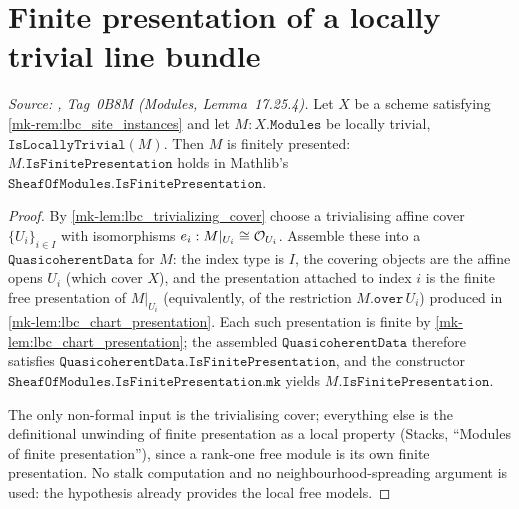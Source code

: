 \section{Finite presentation of a locally trivial line bundle}
\label{mk-sec:lbc_finite_presentation}

\begin{theorem}\label{mk-thm:lbc_isFinitePresentation}
  \leanok

  \textit{Source: \cite{stacks-project}, Tag~0B8M (Modules, Lemma~17.25.4).}
  Let \(X\) be a scheme satisfying \ref{mk-rem:lbc_site_instances} and let
  \(M : X.\mathtt{Modules}\) be locally trivial, \(\texttt{IsLocallyTrivial}(M)\). Then
  \(M\) is finitely presented: \(M.\mathtt{IsFinitePresentation}\) holds in
  Mathlib's \(\mathtt{SheafOfModules.IsFinitePresentation}\).
\end{theorem}

\begin{proof}
  \leanok
  By \ref{mk-lem:lbc_trivializing_cover} choose a trivialising affine cover
  \(\{U_i\}_{i \in I}\) with isomorphisms \(e_i : M|_{U_i} \cong \mathcal{O}_{U_i}\).
  Assemble these into a \(\mathtt{QuasicoherentData}\) for \(M\): the index type
  is \(I\), the covering objects are the affine opens \(U_i\) (which cover \(X\)),
  and the presentation attached to index \(i\) is the finite free presentation of
  \(M|_{U_i}\) (equivalently, of the restriction \(M.\mathtt{over}\,U_i\))
  produced in \ref{mk-lem:lbc_chart_presentation}. Each such presentation is
  finite by \ref{mk-lem:lbc_chart_presentation}; the assembled
  \(\mathtt{QuasicoherentData}\) therefore satisfies
  \(\mathtt{QuasicoherentData.IsFinitePresentation}\), and the constructor
  \(\mathtt{SheafOfModules.IsFinitePresentation.mk}\) yields
  \(M.\mathtt{IsFinitePresentation}\).

  The only non-formal input is the trivialising cover; everything else is the
  definitional unwinding of finite presentation as a local property
  (Stacks, ``Modules of finite presentation''), since a rank-one free module is its own finite
  presentation. No stalk computation and no neighbourhood-spreading argument is
  used: the hypothesis already provides the local free models.
\end{proof}

